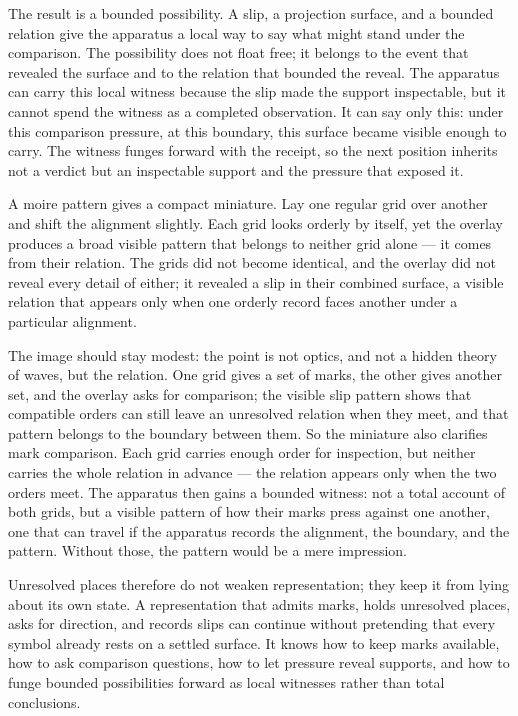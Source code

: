 The result is a bounded possibility. A slip, a projection surface, and a bounded relation give the apparatus a local way to say what might stand under the comparison. The possibility does not float free; it belongs to the event that revealed the surface and to the relation that bounded the reveal. The apparatus can carry this local witness because the slip made the support inspectable, but it cannot spend the witness as a completed observation. It can say only this: under this comparison pressure, at this boundary, this surface became visible enough to carry. The witness funges forward with the receipt, so the next position inherits not a verdict but an inspectable support and the pressure that exposed it.

A moire pattern gives a compact miniature. Lay one regular grid over another and shift the alignment slightly. Each grid looks orderly by itself, yet the overlay produces a broad visible pattern that belongs to neither grid alone --- it comes from their relation. The grids did not become identical, and the overlay did not reveal every detail of either; it revealed a slip in their combined surface, a visible relation that appears only when one orderly record faces another under a particular alignment.

The image should stay modest: the point is not optics, and not a hidden theory of waves, but the relation. One grid gives a set of marks, the other gives another set, and the overlay asks for comparison; the visible slip pattern shows that compatible orders can still leave an unresolved relation when they meet, and that pattern belongs to the boundary between them. So the miniature also clarifies mark comparison. Each grid carries enough order for inspection, but neither carries the whole relation in advance --- the relation appears only when the two orders meet. The apparatus then gains a bounded witness: not a total account of both grids, but a visible pattern of how their marks press against one another, one that can travel if the apparatus records the alignment, the boundary, and the pattern. Without those, the pattern would be a mere impression.

Unresolved places therefore do not weaken representation; they keep it from lying about its own state. A representation that admits marks, holds unresolved places, asks for direction, and records slips can continue without pretending that every symbol already rests on a settled surface. It knows how to keep marks available, how to ask comparison questions, how to let pressure reveal supports, and how to funge bounded possibilities forward as local witnesses rather than total conclusions.

